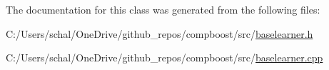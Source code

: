 The documentation for this class was generated from the following files\+:\begin{DoxyCompactItemize}
\item 
C\+:/\+Users/schal/\+One\+Drive/github\+\_\+repos/compboost/src/\mbox{\hyperlink{baselearner_8h}{baselearner.\+h}}\item 
C\+:/\+Users/schal/\+One\+Drive/github\+\_\+repos/compboost/src/\mbox{\hyperlink{baselearner_8cpp}{baselearner.\+cpp}}\end{DoxyCompactItemize}
